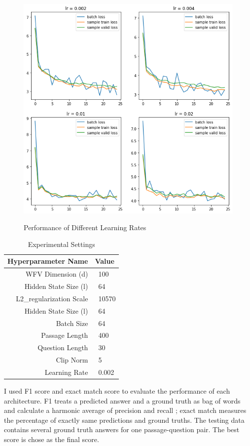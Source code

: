 \documentclass[modernstyle,12pt]{sjsuthesis}
\theoremstyle{definition}
\begin{document}
\begin{figure}[htbp]\centering
  \includegraphics[width=12cm, height=12cm]{figures/lr.png}
  \caption{Performance of Different Learning Rates}
  \label{f:lr}
\end{figure}

\begin{table}[htbp]\centering
  \caption{Experimental Settings}
  \label{tab:settings}
  \begin{tabular}{|r|l|} \hline
    Hyperparameter Name& Value \\ \hline\hline
    WFV Dimension (d) & \ 100 \\
    Hidden State Size (l) & \ 64 \\
    L2\_regularization Scale & \ 10570\\
    Hidden State Size (l) & \ 64\\
    Batch Size & \ 64\\
    Passage Length & \ 400\\
    Question Length & \ 30\\
    Clip Norm & \ 5\\
    Learning Rate & \ 0.002 \\ \hline
  \end{tabular}
\end{table}

I used F1 score and exact match score to evaluate the performance of each architecture. F1 treats a predicted answer and a ground truth as bag of words and calculate a harmonic average of precision and recall ; exact match measures the percentage of exactly same predictions and ground truths. The testing data contains several ground truth answers for one passage-question pair. The best score is chose as the final score.
\end{document}

